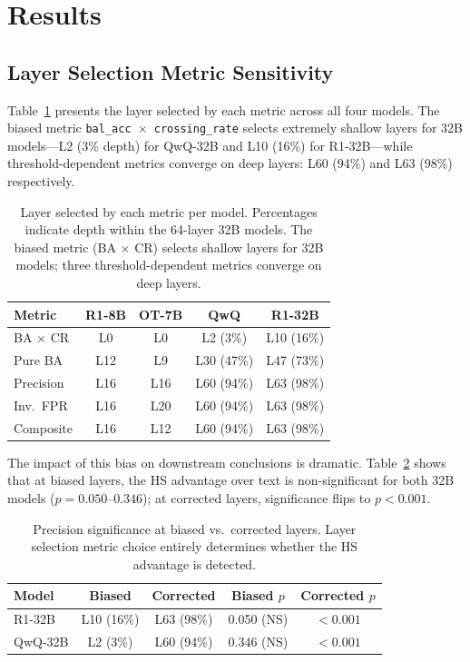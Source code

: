 \documentclass[11pt,a4paper]{article}
\begin{document}
\section{Results}
\label{sec:results}

\subsection{Layer Selection Metric Sensitivity}
\label{sec:layer_results}

Table~\ref{tab:layer_selection} presents the layer selected by each metric across all four models.
The biased metric \texttt{bal\_acc $\times$ crossing\_rate} selects extremely shallow layers for 32B models---L2 (3\% depth) for QwQ-32B and L10 (16\%) for R1-32B---while threshold-dependent metrics converge on deep layers: L60 (94\%) and L63 (98\%) respectively.

\begin{table}[t]
\centering
\small
\begin{tabular}{lcccc}
\toprule
\textbf{Metric} & \textbf{R1-8B} & \textbf{OT-7B} & \textbf{QwQ} & \textbf{R1-32B} \\
\midrule
BA $\times$ CR & L0 & L0 & L2 (3\%) & L10 (16\%) \\
Pure BA & L12 & L9 & L30 (47\%) & L47 (73\%) \\
Precision & L16 & L16 & L60 (94\%) & L63 (98\%) \\
Inv.\ FPR & L16 & L20 & L60 (94\%) & L63 (98\%) \\
Composite & L16 & L12 & L60 (94\%) & L63 (98\%) \\
\bottomrule
\end{tabular}
\caption{Layer selected by each metric per model. Percentages indicate depth within the 64-layer 32B models. The biased metric (BA $\times$ CR) selects shallow layers for 32B models; three threshold-dependent metrics converge on deep layers.}
\label{tab:layer_selection}
\end{table}

The impact of this bias on downstream conclusions is dramatic.
Table~\ref{tab:biased_vs_corrected} shows that at biased layers, the HS advantage over text is non-significant for both 32B models ($p = 0.050$--$0.346$); at corrected layers, significance flips to $p < 0.001$.

\begin{table}[t]
\centering
\small
\begin{tabular}{lcccc}
\toprule
\textbf{Model} & \textbf{Biased} & \textbf{Corrected} & \textbf{Biased $p$} & \textbf{Corrected $p$} \\
\midrule
R1-32B & L10 (16\%) & L63 (98\%) & 0.050 (NS) & ${<}0.001$ \\
QwQ-32B & L2 (3\%) & L60 (94\%) & 0.346 (NS) & ${<}0.001$ \\
\bottomrule
\end{tabular}
\caption{Precision significance at biased vs.\ corrected layers. Layer selection metric choice entirely determines whether the HS advantage is detected.}
\label{tab:biased_vs_corrected}
\end{table}
\end{document}
